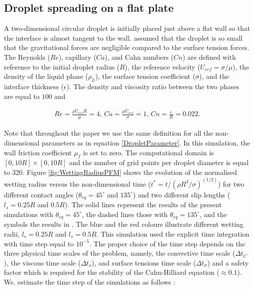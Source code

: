 \documentclass[review]{elsarticle}
\begin{document}
\subsection{Droplet spreading on a flat plate} \label{SpreadingNakaPFM}
A two-dimensional circular droplet is initially placed just above a flat wall so that the interface is almost tangent to the wall.  \cite{Nakamura2013} assumed that the droplet is so small that the gravitational forces are negligible compared to the surface tension forces. The Reynolds ($Re$), capillary ($Ca$), and Cahn numbers ($Cn$) are defined 
with reference to the initial droplet radius ($R$), the reference velocity ($U_{ref} = \sigma/\mu$), the density of the liquid phase ($\rho_L$), the surface tension coefficient ($\sigma$), and the interface thickness ($\epsilon$). The density and viscosity ratio between the two phases are equal to $100$ and
\begin{linenomath}\begin{equation} \label{DropletParameter}
\begin{gathered}
 Re = \frac{\rho U_{ref} R}{\mu} = 4,  \, Ca= \frac{\mu U_{ref} }{\sigma}=1,\,  Cn=\frac{\epsilon}{R}=0.022.
 \end{gathered}
\end{equation}\end{linenomath}
Note that throughout the paper we use the same definition for all the non-dimensional parameters as in equation \ref{DropletParameter}.  In this simulation, the wall friction coefficient $\mu_f$ is set to zero. The computational domain is $[0,10R] \times [0,10R]$ and the number of grid  points per droplet diameter is equal to 320. Figure  \ref{fig:WettingRadiusPFM} shows the evolution of the normalised wetting radius versus the non-dimensional time ($t^*=t/{(\rho R^3/ \sigma)}^{(1/2)}$) for two different contact angles ($\theta_{eq}=45^\circ
$ and $135^\circ$) and two different slip lengths ($l_s=0.25R$ and $0.5R$). The solid lines represent the results of the present simulations with $\theta_{eq}=45^\circ$, the dashed lines those with $\theta_{eq}=135^\circ$, and the symbols the results in \cite{Nakamura2013}. The blue and the red colours illustrate different wetting radii, $l_s=0.25R$ and $l_s=0.5R$. This simulation used the explicit time integration with time step equal to $10^{-5}$.
The proper choice of the time step depends on the three physical time scales of the problem, namely, the convective time scale ($\Delta t_C$), the viscous time scale ($\Delta t_{\nu}$), and surface tensions time scale ($\Delta t_{\sigma}$) and a safety factor which is required for the stability of the Cahn-Hilliard equation ($\approx 0.1$). We. estimate the time step of the simulations as follows \citep{DODD2014416}:
\end{document}
